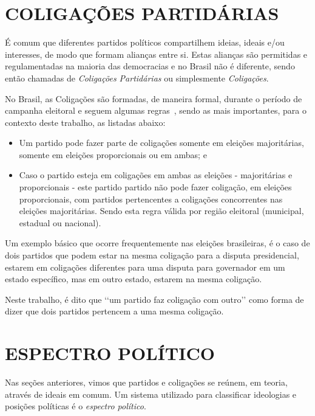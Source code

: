 \section{\texorpdfstring{\MakeUppercase{Coligações Partidárias}}{}}
\label{conceitos__coligacoes}

É comum que diferentes partidos políticos compartilhem ideias, ideais e/ou interesses, de modo que formam alianças entre si. Estas alianças são permitidas e regulamentadas na maioria das democracias e no Brasil não é diferente, sendo então chamadas de \emph{Coligações Partidárias} ou simplesmente \emph{Coligações}.

No Brasil, as Coligações são formadas, de maneira formal, durante o período de campanha eleitoral e seguem algumas regras~\cite{brasil1997lei9504}, sendo as mais importantes, para o contexto deste trabalho, as listadas abaixo:

\begin{itemize}
    \item Um partido pode fazer parte de coligações somente em eleições majoritárias, somente em eleições proporcionais ou em ambas; e
    \item Caso o partido esteja em coligações em ambas as eleições - majoritárias e proporcionais - este partido partido não pode fazer coligação, em eleições proporcionais, com partidos pertencentes a coligações concorrentes nas eleições majoritárias. Sendo esta regra válida por região eleitoral (municipal, estadual ou nacional).
\end{itemize}

Um exemplo básico que ocorre frequentemente nas eleições brasileiras, é o caso de dois partidos que podem estar na mesma coligação para a disputa presidencial, estarem em coligações diferentes para uma disputa para governador em um estado específico, mas em outro estado, estarem na mesma coligação.

Neste trabalho, é dito que ‘‘um partido faz coligação com outro’’ como forma de dizer que dois partidos pertencem a uma mesma coligação.


\section{\texorpdfstring{\MakeUppercase{Espectro Político}}{}}
\label{conceitos__espectro-politico}

Nas seções anteriores, vimos que partidos e coligações se reúnem, em teoria, através de ideais em comum. Um sistema utilizado para classificar ideologias e posições políticas é o \emph{espectro político}.

